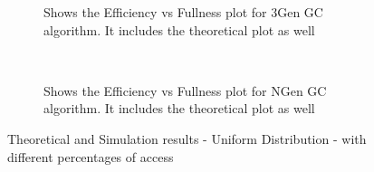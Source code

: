 \begin{figure}[H]
\begin{subfigure}[b]{0.4\textwidth}
                \caption{Shows the Efficiency vs Fullness plot for 3Gen GC algorithm. It includes the theoretical plot as well} \label{3Gen-AllGC-AllAccess-EffVsFull}
        \end{subfigure}
        ~~~ %
        \centering
        \begin{subfigure}[b]{0.4\textwidth}
                \centering
                \caption{Shows the Efficiency vs Fullness plot for NGen GC algorithm. It includes the theoretical plot as well} \label{NGen-AllGC-AllAccess-EffVsFull}
        \end{subfigure}
        \caption{Theoretical and Simulation results - Uniform Distribution - with different percentages of access}
\end{figure}




